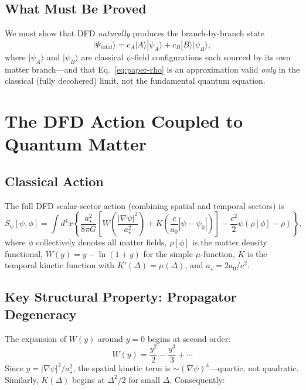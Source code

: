 \documentclass[11pt,a4paper]{article}
\begin{document}
\subsection{What Must Be Proved}

We must show that DFD \emph{naturally} produces the branch-by-branch state
\begin{equation}\label{eq:target}
|\Psi_{\mathrm{total}}\rangle = c_A |A\rangle|\psi_A\rangle
+ c_B |B\rangle|\psi_B\rangle,
\end{equation}
where $|\psi_A\rangle$ and $|\psi_B\rangle$ are classical $\psi$-field
configurations each sourced by its own matter branch---and that
Eq.~\eqref{eq:paper-rho} is an approximation valid \emph{only} in the
classical (fully decohered) limit, not the fundamental quantum equation.

\section{The DFD Action Coupled to Quantum Matter}
\label{sec:action}

\subsection{Classical Action}

The full DFD scalar-sector action (combining spatial and temporal sectors)
is
\begin{equation}\label{eq:DFD-action-full}
S_\psi[\psi,\phi] = \int d^4x\left\{
  \frac{a_\star^2}{8\pi G}\left[
    W\!\left(\frac{|\nabla\psi|^2}{a_\star^2}\right)
    + K\!\left(\frac{c}{a_0}|\dot\psi - \dot\psi_0|\right)
  \right]
  - \frac{c^2}{2}\psi(\rho[\phi] - \bar\rho)
\right\},
\end{equation}
where $\phi$ collectively denotes all matter fields, $\rho[\phi]$ is the
matter density functional, $W(y) = y - \ln(1+y)$ for the simple
$\mu$-function, $K$ is the temporal kinetic function with
$K'(\Delta) = \mu(\Delta)$, and $a_\star = 2a_0/c^2$.

\subsection{Key Structural Property: Propagator Degeneracy}

The expansion of $W(y)$ around $y = 0$ begins at second order:
\begin{equation}
W(y) = \frac{y^2}{2} - \frac{y^3}{3} + \cdots
\end{equation}
Since $y = |\nabla\psi|^2/a_\star^2$, the spatial kinetic term is
$\sim (\nabla\psi)^4$---quartic, not quadratic. Similarly, $K(\Delta)$
begins at $\Delta^2/2$ for small $\Delta$. Consequently:
\end{document}
